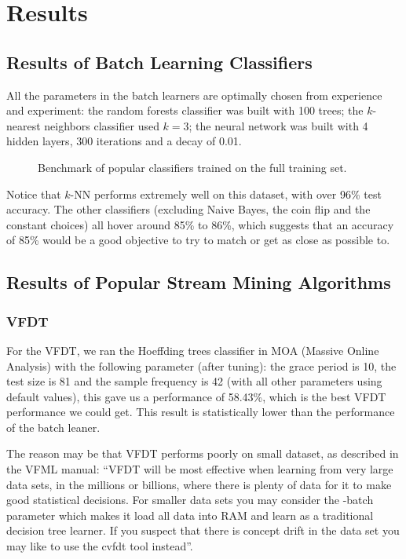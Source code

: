 \documentclass[conference]{IEEEtran}
\begin{document}
		\section{Results}
		\label{sec:experiments-and-results}
		
		\subsection{Results of Batch Learning  Classifiers}
		\label{sec:batch-learning}
		All the parameters in the batch learners are optimally chosen from experience and experiment: the random forests classifier was built with 100 trees; the $k$-nearest neighbors classifier used $k=3$; the neural network was built with 4 hidden layers, 300 iterations and a decay of 0.01.
		
		\begin{figure}[H]
			\centering
			\caption{Benchmark of popular classifiers trained on the full training set.}
			\label{fig:benchmark}
		\end{figure}
		
		Notice that $k$-NN performs extremely well on this dataset, with over 96\% test accuracy. The other classifiers (excluding Naive Bayes, the coin flip and the constant choices) all hover around 85\% to 86\%, which suggests that an accuracy of 85\% would be a good objective to try to match or get as close as possible to.
		
		\subsection{Results of Popular Stream Mining Algorithms}
		\subsubsection{VFDT}
		For the VFDT, we ran the Hoeffding trees classifier in MOA (Massive Online Analysis) with the following parameter (after tuning): the grace period is 10, the test size is 81 and the sample frequency is 42 (with all other parameters using default values), this gave us a performance of 58.43\%, which is the best VFDT performance we could get. This result is statistically lower than the performance of the batch leaner.
		
		The reason may be that VFDT performs poorly on small dataset, as described in the VFML manual\cite{VFML}: ``VFDT  will be most effective when learning from very large data sets, in the millions or billions, where there is plenty of data for it to make good statistical decisions. For smaller data sets you may consider the -batch parameter which makes it load all data into RAM and learn as a traditional decision tree learner. If you suspect that there is concept drift in the data set you may like to use the cvfdt tool instead''.
		
\end{document}

